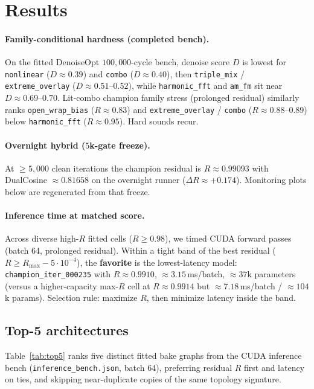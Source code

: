 \section{Results}
\label{sec:results}

\paragraph{Family-conditional hardness (completed bench).}
On the fitted DenoiseOpt $100{,}000$-cycle bench, denoise score $D$ is lowest for \texttt{nonlinear} ($D\approx 0.39$) and \texttt{combo} ($D\approx 0.40$), then \texttt{triple\_mix} / \texttt{extreme\_overlay} ($D\approx 0.51$--$0.52$), while \texttt{harmonic\_fft} and \texttt{am\_fm} sit near $D\approx 0.69$--$0.70$.
Lit-combo champion family stress (prolonged residual) similarly ranks \texttt{open\_wrap\_bias} ($R\approx 0.83$) and \texttt{extreme\_overlay} / \texttt{combo} ($R\approx 0.88$--$0.89$) below \texttt{harmonic\_fft} ($R\approx 0.95$).
Hard sounds recur.

\paragraph{Overnight hybrid ($5$k-gate freeze).}
At $\ge 5{,}000$ clean iterations the champion residual is $R\approx 0.99093$ with DualCosine $\approx 0.81658$ on the overnight runner ($\Delta R\approx{+}0.174$).
Monitoring plots below are regenerated from that freeze.

\paragraph{Inference time at matched score.}
Across diverse high-$R$ fitted cells ($R\ge 0.98$), we timed CUDA forward passes (batch 64, prolonged residual).
Within a tight band of the best residual ($R \ge R_{\max}-5\cdot10^{-4}$), the \textbf{favorite} is the lowest-latency model:
\texttt{champion\_iter\_000235} with $R\approx 0.9910$, $\approx 3.15$\,ms/batch, $\approx 37$k parameters
(versus a higher-capacity max-$R$ cell at $R\approx 0.9914$ but $\approx 7.18$\,ms/batch / $\approx 104$k params).
Selection rule: maximize $R$, then minimize latency inside the band.

\subsection{Top-5 architectures}
\label{sec:top5-arch}
Table~\ref{tab:top5} ranks five distinct fitted bake graphs from the CUDA inference bench
(\texttt{inference\_bench.json}, batch 64), preferring residual $R$ first and latency on ties,
and skipping near-duplicate copies of the same topology signature.


